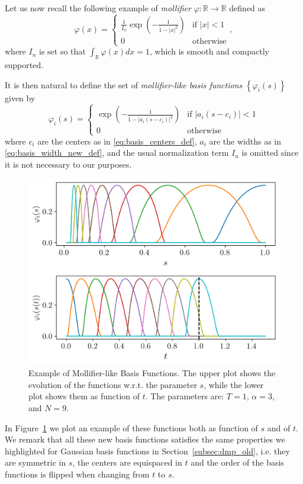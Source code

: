 \documentclass[fleqn, 11pt]{article}
\theoremstyle{definition}
\theoremstyle{plain}
\theoremstyle{remark}
\begin{document}
Let us now recall the following example of \emph{mollifier} $ \varphi : \mathbb{R} \to \mathbb{R} $ defined as
\begin{equation*}
    \label{eq:mollifier_def}
    \varphi (x) =
    \begin{cases}
        \frac{1}{I_n} \exp \left( { - \frac{ 1 }{ 1 - |x|^2 } } \right)  & \text{if }|x| < 1 \\
        0 & \text{otherwise}
    \end{cases},
\end{equation*}
where $ I_n $ is set so that $\int_\mathbb{R} \varphi (x) d\! x = 1$, which is smooth and compactly supported.

It is then natural to define the set of \emph{mollifier-like basis functions} $ \left\{  \varphi_i (s)  \right\}$ given by
\begin{equation}
    \label{eq:mollifier_basis_def}
    \varphi_i(s) =
    \begin{cases}
        \exp \left( { - \frac{ 1 }{ 1 - | a_i (s - c_i) | ^ 2 } } \right)   & \text{if } | { a_i (s - c_i) } | < 1 \\
        0 & \text{otherwise}
    \end{cases}
\end{equation}
where $c_i$ are the centers as in \eqref{eq:basis_centers_def}, $a_i$ are the widths as in \eqref{eq:basis_width_new_def}, and the usual normalization term $I_n$ is omitted since it is not necessary to our purposes.

\begin{figure}
    \centering
    \includegraphics[width = 0.5\linewidth]{imgs/mollif_bfs.png}
    \caption{Example of Mollifier-like Basis Functions.
    The upper plot shows the evolution of the functions w.r.t. the parameter $s$, while the lower plot shows them as function of $t$.
    The parameters are: $ T = 1 $, $ \alpha = 3 $, and $ N = 9 $.}
    \label{fig:mollifier_basis_plot}
\end{figure}

In Figure~\ref{fig:mollifier_basis_plot} we plot an example of these functions both as function of $s$ and of $t$.
We remark that all these new basis functions satisfies the same properties we highlighted for Gaussian basis functions in Section~\ref{subsec:dmp_old}, i.e. they are symmetric in $s$, the centers are equispaced in $t$ and the order of the basis functions is flipped when changing from $t$ to $s$.
\end{document}
